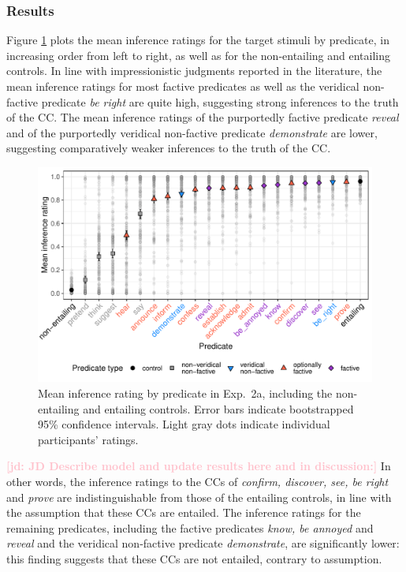 \documentclass[11pt,fleqn]{article}
\newcommand{\jd}[1]{\textbf{\textcolor{Pink}{[jd: #1]}}}
\newcommand{\6}{\mbox{$[\hspace*{-.6mm}[$}}
\newcommand{\9}{\mbox{$]\hspace*{-.6mm}]$}}
\begin{document}
\subsubsection{Results}


Figure \ref{f-veridicality-predicate} plots the mean inference ratings for the target stimuli by predicate, in increasing order from left to right, as well as for the non-entailing and entailing controls. In line with impressionistic judgments reported in the literature, the mean inference ratings for most factive predicates as well as the veridical non-factive predicate {\em be right} are quite high, suggesting strong inferences to the truth of the CC. The mean inference ratings of the purportedly factive predicate {\em reveal} and of the purportedly veridical non-factive predicate {\em demonstrate} are lower, suggesting comparatively weaker inferences to the truth of the CC. 

\begin{figure}[h!]
\centering

\includegraphics[width=.7\paperwidth]{../../results/4-veridicality3/graphs/means-inference-by-predicate-variability}

\caption{Mean inference rating by predicate in Exp.~2a, including the non-entailing and entailing controls. Error bars indicate bootstrapped 95\% confidence intervals. Light gray dots indicate individual participants' ratings.} 
\label{f-veridicality-predicate}
\end{figure}

\jd{JD Describe model and update results here and in discussion:} In other words, the inference ratings to the CCs of {\em confirm, discover, see, be right} and {\em prove} are indistinguishable from those of the entailing controls, in line with the assumption that these CCs are entailed. The inference ratings for the remaining predicates, including the factive predicates {\em know, be annoyed} and {\em reveal} and the veridical non-factive predicate {\em demonstrate}, are significantly lower: this finding suggests that these CCs are not entailed, contrary to assumption. 
\end{document}
